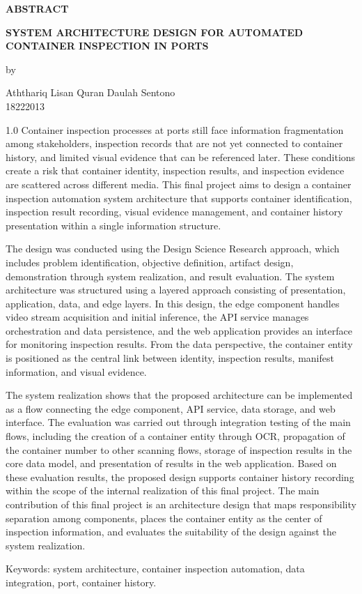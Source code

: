 \documentclass[12pt,a4paper]{article}
\begin{document}
\begin{center}
{\large\bfseries ABSTRACT}

\vspace{0.45cm}

\textbf{SYSTEM ARCHITECTURE DESIGN FOR AUTOMATED CONTAINER INSPECTION IN PORTS}

\vspace{0.4cm}
by

\vspace{0.4cm}
Aththariq Lisan Quran Daulah Sentono\\
18222013
\end{center}

\begin{spacing}{1.0}
Container inspection processes at ports still face information fragmentation
among stakeholders, inspection records that are not yet connected to container
history, and limited visual evidence that can be referenced later. These
conditions create a risk that container identity, inspection results, and
inspection evidence are scattered across different media. This final project
aims to design a container inspection automation system architecture that
supports container identification, inspection result recording, visual evidence
management, and container history presentation within a single information
structure.

The design was conducted using the Design Science Research approach, which
includes problem identification, objective definition, artifact design,
demonstration through system realization, and result evaluation. The system
architecture was structured using a layered approach consisting of presentation,
application, data, and edge layers. In this design, the edge component handles
video stream acquisition and initial inference, the API service manages
orchestration and data persistence, and the web application provides an
interface for monitoring inspection results. From the data perspective, the
container entity is positioned as the central link between identity, inspection
results, manifest information, and visual evidence.

The system realization shows that the proposed architecture can be implemented
as a flow connecting the edge component, API service, data storage, and web
interface. The evaluation was carried out through integration testing of the
main flows, including the creation of a container entity through OCR, propagation
of the container number to other scanning flows, storage of inspection results
in the core data model, and presentation of results in the web application.
Based on these evaluation results, the proposed design supports container
history recording within the scope of the internal realization of this final
project. The main contribution of this final project is an architecture design
that maps responsibility separation among components, places the container
entity as the center of inspection information, and evaluates the suitability of
the design against the system realization.

Keywords: system architecture, container inspection automation, data
integration, port, container history.
\end{spacing}
\end{document}

